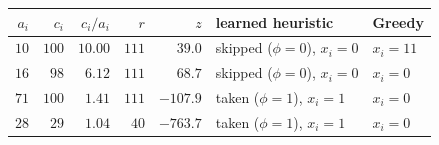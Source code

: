 \begin{tabular}{@{}rrrrrll@{}}
\toprule
$a_i$ & $c_i$ & $c_i/a_i$ & $r$ & $z$ & learned heuristic & Greedy \\
\midrule
$10$ & $100$ & $10.00$ & $111$ & $39.0$ & skipped ($\phi=0$), $x_i=0$ & $x_i=11$ \\
$16$ & $98$ & $6.12$ & $111$ & $68.7$ & skipped ($\phi=0$), $x_i=0$ & $x_i=0$ \\
$71$ & $100$ & $1.41$ & $111$ & $-107.9$ & taken ($\phi=1$), $x_i=1$ & $x_i=0$ \\
$28$ & $29$ & $1.04$ & $40$ & $-763.7$ & taken ($\phi=1$), $x_i=1$ & $x_i=0$ \\
\bottomrule
\end{tabular}
